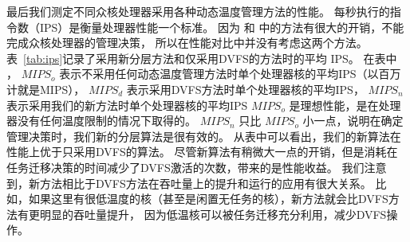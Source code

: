  最后我们测定不同众核处理器采用各种动态温度管理方法的性能。
 每秒执行的指令数（IPS）是衡量处理器性能一个标准。
 因为\cite{MaWang:APCCAS'14} 和 \cite{Hanumaiah:TCAD'11}中的方法有很大的开销，不能完成众核处理器的管理决策，
 所以在性能对比中并没有考虑这两个方法。
 表~\ref{tab:ips}记录了采用新分层方法和仅采用DVFS的方法时的平均 IPS。
 在表中 ， $MIPS_o$ 表示不采用任何动态温度管理方法时单个处理器核的平均IPS（以百万计就是MIPS），
 $MIPS_d$ 表示采用DVFS方法时单个处理器核的平均IPS，
 $MIPS_n$ 表示采用我们的新方法时单个处理器核的平均IPS
 $MIPS_o$ 是理想性能，是在处理器没有任何温度限制的情况下取得的。
  $MIPS_n$ 只比  $MIPS_o$ 小一点，说明在确定管理决策时，我们新的分层算法是很有效的。
  从表中可以看出，我们的新算法在性能上优于只采用DVFS的算法。
  尽管新算法有稍微大一点的开销，但是消耗在任务迁移决策的时间减少了DVFS激活的次数，带来的是性能收益。
  我们注意到，新方法相比于DVFS方法在吞吐量上的提升和运行的应用有很大关系。
  比如，如果这里有很低温度的核（甚至是闲置无任务的核），新方法就会比DVFS方法有更明显的吞吐量提升，
  因为低温核可以被任务迁移充分利用，减少DVFS操作。
  
 
 
 
 
 
 


























